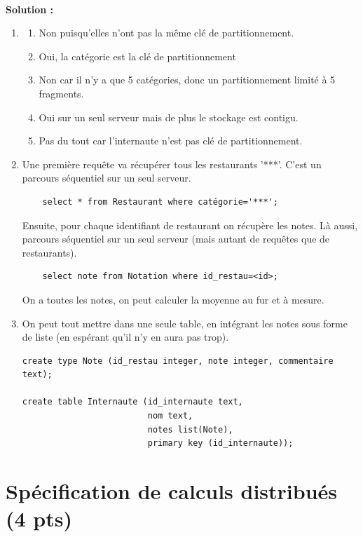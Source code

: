 \documentclass[10pt,a4paper]{article}
\newenvironment{solution}[0]{
~\\ \color{red} \textbf{Solution : }\color{black}}{%
}
\begin{document}
\begin{solution}
\begin{enumerate}
\item
\begin{enumerate}
  \item Non puisqu'elles n'ont pas la même clé de partitionnement.
   \item Oui, la catégorie est la clé de partitionnement
   \item Non car il n'y a que 5 catégories, donc un partitionnement limité à 5 fragments.
   \item Oui sur un seul serveur mais de plus le stockage est contigu.
   \item Pas du tout car l'internaute n'est pas clé de partitionnement. 
\end{enumerate} 
  \item Une première requête va récupérer tous les restaurants 
   '***'. C'est un parcours séquentiel sur un seul serveur.
\begin{verbatim}
    select * from Restaurant where catégorie='***';
\end{verbatim}

    Ensuite, pour chaque identifiant de restaurant on
    récupère les notes. Là aussi, parcours séquentiel sur un seul serveur
    (mais autant de requêtes que de restaurants).
\begin{verbatim}
    select note from Notation where id_restau=<id>;
\end{verbatim}
     On a toutes les notes, on peut calculer la moyenne au fur et à mesure.
   \item On peut tout mettre dans une seule table,
  en intégrant les notes sous forme de liste (en espérant qu'il
  n'y en aura pas trop).

\begin{verbatim}
create type Note (id_restau integer, note integer, commentaire text);                 

create table Internaute (id_internaute text,
                         nom text,
                         notes list(Note),
                         primary key (id_internaute));
\end{verbatim}

\end{enumerate}
\end{solution}

\section{Spécification de calculs distribués (4 pts)}
\end{document}
